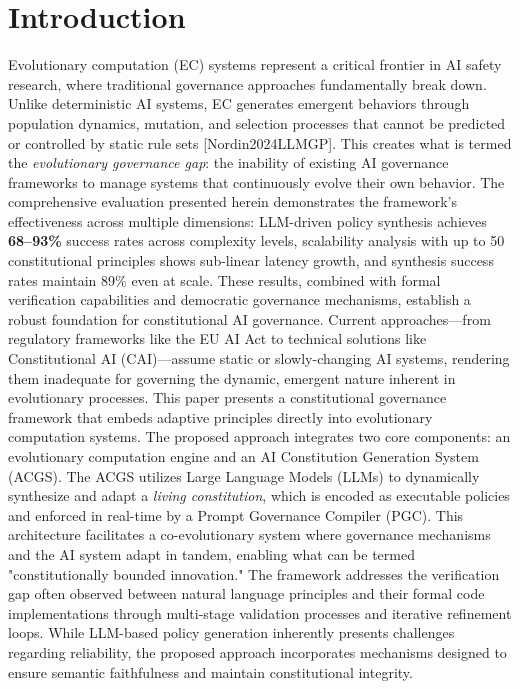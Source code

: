\documentclass[sigconf]{acmart} %
\begin{document}
\section{Introduction}
\label{sec:introduction}
Evolutionary computation (EC) systems represent a critical frontier in AI safety research, where traditional governance approaches fundamentally break down.
Unlike deterministic AI systems, EC generates emergent behaviors through population dynamics, mutation, and selection processes that cannot be predicted or controlled by static rule sets [Nordin2024LLMGP].
This creates what is termed the \textit{evolutionary governance gap}: the inability of existing AI governance frameworks to manage systems that continuously evolve their own behavior.
The comprehensive evaluation presented herein demonstrates the framework's effectiveness across multiple dimensions: LLM-driven policy synthesis achieves \textbf{68--93\%} success rates across complexity levels, scalability analysis with up to 50 constitutional principles shows sub-linear latency growth, and synthesis success rates maintain 89\% even at scale.
These results, combined with formal verification capabilities and democratic governance mechanisms, establish a robust foundation for constitutional AI governance.
Current approaches—from regulatory frameworks like the EU AI Act to technical solutions like Constitutional AI (CAI)—assume static or slowly-changing AI systems, rendering them inadequate for governing the dynamic, emergent nature inherent in evolutionary processes.
This paper presents a constitutional governance framework that embeds adaptive principles directly into evolutionary computation systems.
The proposed approach integrates two core components: an evolutionary computation engine and an AI Constitution Generation System (ACGS).
The ACGS utilizes Large Language Models (LLMs) to dynamically synthesize and adapt a \textit{living constitution}, which is encoded as executable policies and enforced in real-time by a Prompt Governance Compiler (PGC).
This architecture facilitates a co-evolutionary system where governance mechanisms and the AI system adapt in tandem, enabling what can be termed "constitutionally bounded innovation."
The framework addresses the verification gap often observed between natural language principles and their formal code implementations through multi-stage validation processes and iterative refinement loops.
While LLM-based policy generation inherently presents challenges regarding reliability, the proposed approach incorporates mechanisms designed to ensure semantic faithfulness and maintain constitutional integrity.
\end{document}
